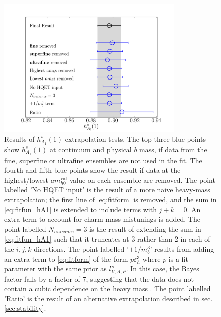\begin{figure}[htb!]
  \begin{center}
  \hspace{-18pt}
  \includegraphics[width=0.8\textwidth]{images/BsDsstar/hA1vsmh_fittests.pdf}
  
  \caption{Results of $h_{A_1}^s(1)$ extrapolation tests. The top three blue points show $h_{A_1}^s(1)$ at continuum and physical $b$ mass, if data from the fine, superfine or ultrafine ensembles are not used in the fit. The fourth and fifth blue points show the result if data at the highest/lowest $am_{h0}^{\text{val}}$ value on each ensemble are removed. The point labelled 'No HQET input' is the result of a more naive heavy-mass extrapolation; the first line of \eqref{eq:fitform} is removed, and the sum in \eqref{eq:fitfun_hA1} is extended to include terms with $j+k=0$. An extra term to account for charm mass mistunings is added. The point labelled $N_{nuisance}=3$ is the result of extending the sum in \eqref{eq:fitfun_hA1} such that it truncates at 3 rather than 2 in each of the $i,j,k$ directions. The point labelled '$+1/m_b^3$' results from adding an extra term to \eqref{eq:fitform} of the form $p\varepsilon_h^3$ where $p$ is a fit parameter with the same prior as $l_{V,A,P}^s$. In this case, the Bayes factor falls by a factor of 7, suggesting that the data does not contain a cubic dependence on the heavy mass . The point labelled 'Ratio' is the result of an alternative extrapolation described in sec. \ref{sec:stability}.  \label{fig:fittests}}
    \end{center}
\end{figure}

